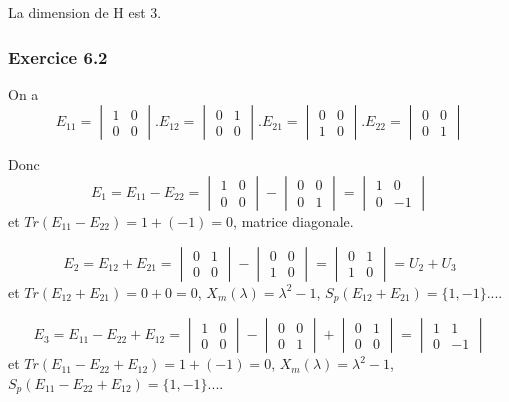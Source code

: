 \documentclass[]{book}
\theoremstyle{definition}
\begin{document}
La dimension de H est 3.

\subsubsection*{Exercice 6.2}
On a 
$$E_{11} = \begin{vmatrix} 1 & 0 \\ 0 & 0 \end{vmatrix} . E_{12} = \begin{vmatrix} 0 & 1 \\ 0 & 0 \end{vmatrix} . E_{21} = \begin{vmatrix} 0 & 0 \\ 1 & 0 \end{vmatrix}. E_{22} = \begin{vmatrix} 0 & 0 \\ 0 & 1 \end{vmatrix}$$

Donc
$$
E_1 = E_{11}-E_{22} = \begin{vmatrix} 1 & 0 \\ 0 & 0 \end{vmatrix} - \begin{vmatrix} 0 & 0 \\ 0 & 1 \end{vmatrix} =  \begin{vmatrix} 1 & 0 \\ 0 & -1 \end{vmatrix}
$$
et $Tr(E_{11}-E_{22}) = 1 + (-1) = 0$, matrice diagonale.

$$
E_2 = E_{12}+E_{21} = \begin{vmatrix} 0 & 1 \\ 0 & 0 \end{vmatrix} - \begin{vmatrix} 0 & 0 \\ 1 & 0 \end{vmatrix} =  \begin{vmatrix} 0 & 1 \\ 1 & 0 \end{vmatrix} = U_2 + U_3
$$
et $Tr(E_{12}+E_{21}) = 0 + 0 = 0$, $X_m(\lambda) = \lambda^2-1$, $S_p(E_{12}+E_{21}) = \{1, -1\}$.... 

$$
E_3 = E_{11}-E_{22}+E_{12} = \begin{vmatrix} 1 & 0 \\ 0 & 0 \end{vmatrix} - \begin{vmatrix} 0 & 0 \\ 0 & 1 \end{vmatrix} + \begin{vmatrix} 0 & 1 \\ 0 & 0 \end{vmatrix} =  \begin{vmatrix} 1 & 1 \\ 0 & -1 \end{vmatrix} 
$$
et $Tr(E_{11}-E_{22}+E_{12}) = 1 + (-1) = 0$, $X_m(\lambda) = \lambda^2-1$, $S_p(E_{11}-E_{22}+E_{12}) = \{1, -1\}$.... 
\end{document}
